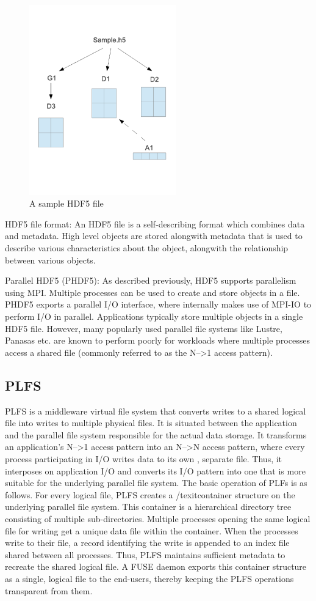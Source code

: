 \begin{figure}[!t]
\centering
\includegraphics[width=2.5in]{hdf5_example}
\caption{A sample HDF5 file}
\label{hdf5_example}
\end{figure}

HDF5 file format:
An HDF5 file is a self-describing format which combines data and metadata. High level objects are stored alongwith metadata that is used to describe various characteristics about the object, alongwith the relationship between various objects.  

Parallel HDF5 (PHDF5):
As described previously, HDF5 supports parallelism using MPI. Multiple processes can be used to create and store objects in a file. PHDF5 exports a parallel I/O interface, where internally makes use of MPI-IO to perform I/O in parallel. 
Applications typically store multiple objects in a single HDF5 file. However, many popularly used parallel file systems like Lustre, Panasas etc. are known to perform poorly for workloads where multiple processes access a shared file (commonly referred to as the N-->1 access pattern). 

\subsection{PLFS}
PLFS is a middleware virtual file system that converts writes to a shared logical file into writes to multiple physical files. 
It is situated between the application and the parallel file system responsible for the actual data storage. 
It transforms an application's N-->1 access pattern into an N-->N access pattern, where every process participating in I/O writes data to its own , separate file. 
Thus, it interposes on application I/O and converts its I/O pattern into one that is more suitable for the underlying parallel file system.
The basic operation of PLFs is as follows. For every logical file, PLFS creates a /texit{container} structure on the underlying parallel file system. 
This container is a hierarchical directory tree consisting of multiple sub-directories. Multiple processes opening the same logical file for writing get a unique data file within the container. When the processes write to their file, a record identifying the write is appended to an index file shared between all processes. Thus, PLFS maintains sufficient metadata to recreate the shared logical file. A FUSE daemon exports this container structure as a single, logical file to the end-users, thereby keeping the PLFS operations transparent from them. 

